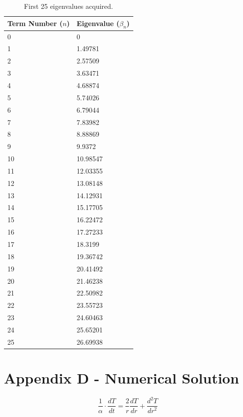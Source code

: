 \documentclass[12pt,letterpaper]{article}
\begin{document}
{{\begin{table}[h]
     \centering
    \begin{tabularx}{\textwidth}{bb}
       \hline
       \textbf{Term Number ($n$)} & \textbf{Eigenvalue ($\beta_n$)}  \\
       \hline
        0 & 0 \\
        1 & 1.49781\\ 
        2 & 2.57509\\ 
        3 & 3.63471\\ 
        4 & 4.68874\\ 
        5 & 5.74026\\ 
        6 & 6.79044\\ 
        7 & 7.83982\\ 
        8 & 8.88869\\ 
        9 & 9.9372\\ 
        10 & 10.98547\\ 
        11 & 12.03355\\ 
        12 & 13.08148\\ 
        13 & 14.12931\\ 
        14 & 15.17705\\ 
        15 & 16.22472\\ 
        16 & 17.27233\\ 
        17 & 18.3199\\ 
        18 & 19.36742\\ 
        19 & 20.41492\\ 
        20 & 21.46238\\ 
        21 & 22.50982\\ 
        22 & 23.55723\\ 
        23 & 24.60463\\ 
        24 & 25.65201\\ 
        25 & 26.69938\\ 

        \hline
    \end{tabularx}
    \caption {First 25 eigenvalues acquired.}
    \label{tab:eign}
\end{table}





\section*{Appendix D - Numerical Solution}


\[\frac{1}{\alpha} \cdot \frac{dT}{dt} = \frac{2}{r} \frac{dT}{dr} + \frac{d^2T}{dr^2}\]

}}
\end{document}
